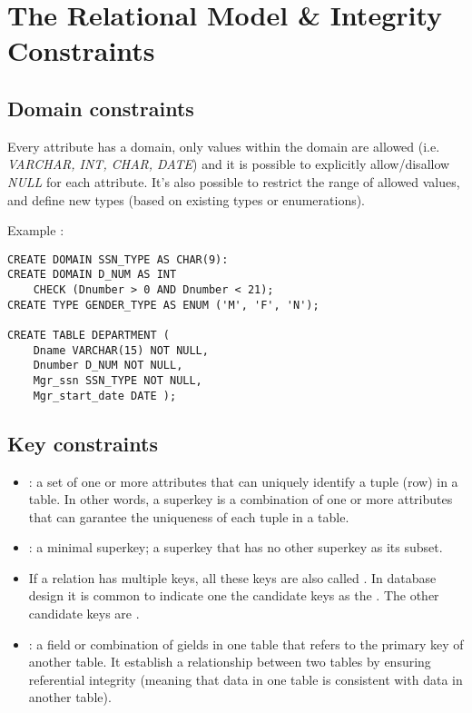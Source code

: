 \chapter{The Relational Model \& Integrity Constraints}

\section{Domain constraints}

Every attribute has a domain, only values within the domain are allowed (i.e. \textit{VARCHAR, INT, CHAR, DATE}) and it is possible to explicitly allow/disallow \textit{NULL} for each attribute. It's also possible to restrict the range of allowed values, and define new types (based on existing types or enumerations).

Example :

\begin{verbatim}
CREATE DOMAIN SSN_TYPE AS CHAR(9):
CREATE DOMAIN D_NUM AS INT
    CHECK (Dnumber > 0 AND Dnumber < 21);
CREATE TYPE GENDER_TYPE AS ENUM ('M', 'F', 'N');

CREATE TABLE DEPARTMENT (
    Dname VARCHAR(15) NOT NULL,
    Dnumber D_NUM NOT NULL,
    Mgr_ssn SSN_TYPE NOT NULL,
    Mgr_start_date DATE );
\end{verbatim}

\section{Key constraints}

\begin{itemize}
    \item {} : a set of one or more attributes that can uniquely identify a tuple (row) in a table. In other words, a superkey is a combination of one or more attributes that can garantee the uniqueness of each tuple in a table.
    \item {} : a minimal superkey; a superkey that has no other superkey as its subset.
    \item If a relation has multiple keys, all these keys are also called . In database design it is common to indicate one the candidate keys as the . The other candidate keys are .
    \item {} : a field or combination of gields in one table that refers to the primary key of another table. It establish a relationship between two tables by ensuring referential integrity (meaning that data in one table is consistent with data in another table).
\end{itemize}

